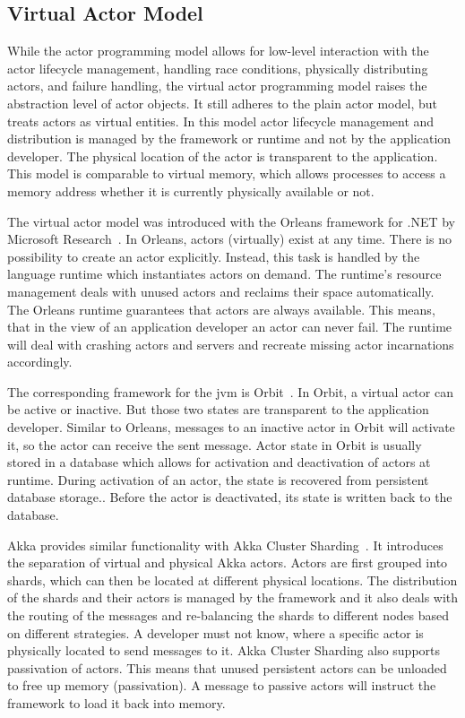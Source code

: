   \subsection{Virtual Actor Model}
  While the actor programming model allows for low-level interaction with the actor lifecycle management, handling race conditions, physically distributing actors, and failure handling, the virtual actor programming model raises the abstraction level of actor objects.
  It still adheres to the plain actor model, but treats actors as virtual entities.
  In this model actor lifecycle management and distribution is managed by the framework or runtime and not by the application developer.
  The physical location of the actor is transparent to the application.
  This model is comparable to virtual memory, which allows processes to access a memory address whether it is currently physically available or not.

  The virtual actor model was introduced with the Orleans framework for .NET by Microsoft Research~\cite{bernstein:orleans}.
  In Orleans, actors (virtually) exist at any time.
  There is no possibility to create an actor explicitly.
  Instead, this task is handled by the language runtime which instantiates actors on demand.
  The runtime's resource management deals with unused actors and reclaims their space automatically.
  The Orleans runtime guarantees that actors are always available.
  This means, that in the view of an application developer an actor can never fail.
  The runtime will deal with crashing actors and servers and recreate missing actor incarnations accordingly.

  The corresponding framework for the \gls{jvm} is Orbit~\cite{orbit}.
  In Orbit, a virtual actor can be active or inactive.
  But those two states are transparent to the application developer.
  Similar to Orleans, messages to an inactive actor in Orbit will activate it, so the actor can receive the sent message.
  Actor state in Orbit is usually stored in a database which allows for activation and deactivation of actors at runtime.
  During activation of an actor, the state is recovered from persistent database storage..
  Before the actor is deactivated, its state is written back to the database.

  Akka provides similar functionality with Akka Cluster Sharding~\cite{akka:clustersharding}.
  It introduces the separation of virtual and physical Akka actors.
  Actors are first grouped into shards, which can then be located at different physical locations.
  The distribution of the shards and their actors is managed by the framework and it also deals with the routing of the messages and re-balancing the shards to different nodes based on different strategies.
  A developer must not know, where a specific actor is physically located to send messages to it.
  Akka Cluster Sharding also supports passivation of actors.
  This means that unused persistent actors can be unloaded to free up memory (passivation).
  A message to passive actors will instruct the framework to load it back into memory.

